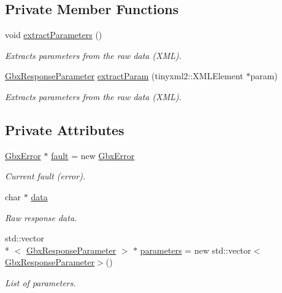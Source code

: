 \subsection*{Private Member Functions}
\begin{DoxyCompactItemize}
\item 
void \hyperlink{classGbxResponse_a3cd4d6c5458fcd5359b8f5d9921a2a9b}{extract\-Parameters} ()
\begin{DoxyCompactList}\small\item\em Extracts parameters from the raw data (X\-M\-L). \end{DoxyCompactList}\item 
\hyperlink{classGbxResponseParameter}{Gbx\-Response\-Parameter} \hyperlink{classGbxResponse_af8501950f3b82ce74924f3bda746871b}{extract\-Param} (tinyxml2\-::\-X\-M\-L\-Element $\ast$param)
\begin{DoxyCompactList}\small\item\em Extracts parameters from the raw data (X\-M\-L). \end{DoxyCompactList}\end{DoxyCompactItemize}
\subsection*{Private Attributes}
\begin{DoxyCompactItemize}
\item 
\hyperlink{structGbxError}{Gbx\-Error} $\ast$ \hyperlink{classGbxResponse_ad896e7447681008320ad9945b57a92ad}{fault} = new \hyperlink{structGbxError}{Gbx\-Error}
\begin{DoxyCompactList}\small\item\em Current fault (error). \end{DoxyCompactList}\item 
char $\ast$ \hyperlink{classGbxResponse_aee1c7b03d870c87883bd97740afd7675}{data}
\begin{DoxyCompactList}\small\item\em Raw response data. \end{DoxyCompactList}\item 
std\-::vector\\*
$<$ \hyperlink{classGbxResponseParameter}{Gbx\-Response\-Parameter} $>$ $\ast$ \hyperlink{classGbxResponse_afcbec4555fa682d9d1360ecff829d0f2}{parameters} = new std\-::vector$<$\hyperlink{classGbxResponseParameter}{Gbx\-Response\-Parameter}$>$()
\begin{DoxyCompactList}\small\item\em List of parameters. \end{DoxyCompactList}\end{DoxyCompactItemize}


